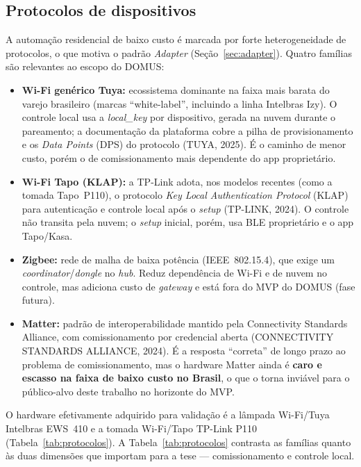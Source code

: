 \subsection{Protocolos de dispositivos}\label{sec:protocolos}

A automação residencial de baixo custo é marcada por forte heterogeneidade de
protocolos, o que motiva o padrão \textit{Adapter} (Seção~\ref{sec:adapter}).
Quatro famílias são relevantes ao escopo do DOMUS:

\begin{itemize}
  \item \textbf{Wi-Fi genérico Tuya:} ecossistema dominante na faixa mais barata
        do varejo brasileiro (marcas ``white-label'', incluindo a linha Intelbras
        Izy). O controle local usa a \textit{local\_key} por dispositivo, gerada na
        nuvem durante o pareamento; a documentação da plataforma cobre a pilha de
        provisionamento e os \textit{Data Points} (DPS) do protocolo (TUYA, 2025).
        É o caminho de menor custo, porém o de comissionamento mais dependente do
        app proprietário.
  \item \textbf{Wi-Fi Tapo (KLAP):} a TP-Link adota, nos modelos recentes (como a
        tomada Tapo~P110), o protocolo \textit{Key Local Authentication Protocol}
        (KLAP) para autenticação e controle local após o \textit{setup}
        (TP-LINK, 2024). O controle não transita pela nuvem; o \textit{setup}
        inicial, porém, usa BLE proprietário e o app Tapo/Kasa.
  \item \textbf{Zigbee:} rede de malha de baixa potência (IEEE~802.15.4), que exige
        um \textit{coordinator}/\textit{dongle} no \textit{hub}. Reduz dependência
        de Wi-Fi e de nuvem no controle, mas adiciona custo de \textit{gateway} e
        está fora do MVP do DOMUS (fase futura).
  \item \textbf{Matter:} padrão de interoperabilidade mantido pela Connectivity
        Standards Alliance, com comissionamento por credencial aberta
        (CONNECTIVITY STANDARDS ALLIANCE, 2024). É a resposta ``correta'' de longo
        prazo ao problema de comissionamento, mas o hardware Matter ainda é
        \textbf{caro e escasso na faixa de baixo custo no Brasil}, o que o torna
        inviável para o público-alvo deste trabalho no horizonte do MVP.
\end{itemize}

O hardware efetivamente adquirido para validação é a lâmpada Wi-Fi/Tuya Intelbras
EWS~410 e a tomada Wi-Fi/Tapo TP-Link P110 (Tabela~\ref{tab:protocolos}). A
Tabela~\ref{tab:protocolos} contrasta as famílias quanto às duas dimensões que
importam para a tese --- comissionamento e controle local.

